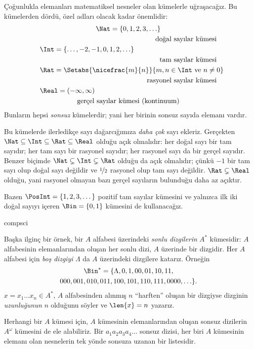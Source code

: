 \documentclass[../../../include/open-logic-section]{subfiles}
\begin{document}

\begin{ex}
Çoğunlukla elemanları matematiksel nesneler olan kümelerle
uğraşacağız. Bu kümelerden dördü, özel adları olacak kadar önemlidir:
\begin{multline*}
    \Nat = \{0, 1, 2, 3, \ldots\} \\
    \shoveright{\text{doğal sayılar kümesi}}\\
    \shoveleft{\Int = \{\ldots, -2, -1, 0, 1, 2, \ldots\}} \\
    \shoveright{\text{tam sayılar kümesi}}\\
    \shoveleft{\Rat = \Setabs{\nicefrac{m}{n}}{m, n \in \Int\text{ ve }n \neq 0}}\\
    \shoveright{\text{rasyonel sayılar kümesi}}\\
    \shoveleft{\Real = (-\infty, \infty)}\\
    \text{gerçel sayılar kümesi (kontinuum)}
\end{multline*}
Bunların hepsi \emph{sonsuz} kümelerdir; yani her birinin sonsuz sayıda
elemanı vardır.

Bu kümelerde ilerledikçe sayı dağarcığımıza \emph{daha çok} sayı ekleriz.
Gerçekten $\Nat \subseteq \Int \subseteq \Rat \subseteq \Real$ olduğu açık
olmalıdır: her doğal sayı bir tam sayıdır; her tam sayı bir rasyonel sayıdır;
her rasyonel sayı da bir gerçel sayıdır. Benzer biçimde
$\Nat \subsetneq \Int \subsetneq \Rat$ olduğu da açık olmalıdır; çünkü $-1$
bir tam sayı olup doğal sayı değildir ve $\nicefrac{1}{2}$ rasyonel olup tam
sayı değildir. $\Rat \subsetneq \Real$ olduğu, yani rasyonel olmayan bazı
gerçel sayıların bulunduğu daha az açıktır.

Bazen $\PosInt = \{1, 2, 3, \dots\}$ pozitif tam sayılar kümesini ve yalnızca
ilk iki doğal sayıyı içeren $\Bin = \{0, 1\}$ kümesini de kullanacağız.
\end{ex}

\begin{tagblock}{compsci}
\begin{ex}[Dizgiler]
Başka ilginç bir örnek, bir $A$ alfabesi üzerindeki \emph{sonlu dizgilerin}
$A^{*}$ kümesidir: $A$ alfabesinin elemanlarından oluşan her sonlu dizi, $A$ üzerinde
bir dizgidir. Her $A$ alfabesi için \emph{boş dizgiyi $\Lambda$} da $A$
üzerindeki dizgilere katarız. Örneğin
\begin{multline*}
\Bin^*
=\{\Lambda,0,1,00,01,10,11,\\
000,001,010,011,100,101,110,111,0000,\ldots\}.
\end{multline*}
$x=x_{1}\ldots x_{n}\in A^{*}$, $A$ alfabesinden alınmış $n$ ``harften'' oluşan bir
dizgiyse dizginin \emph{uzunluğunun} $n$ olduğunu söyler ve $\len{x}=n$
yazarız.
\end{ex}
\end{tagblock}

\begin{ex}
Herhangi bir $A$ kümesi için, $A$ kümesinin elemanlarından oluşan
sonsuz dizilerin $A^\omega$ kümesini de ele alabiliriz. Bir
$a_1a_2a_3a_4\dots$ sonsuz dizisi, her biri $A$ kümesinin elemanı olan
nesnelerin tek yönde sonsuza uzanan bir listesidir.
\end{ex}
\end{document}
